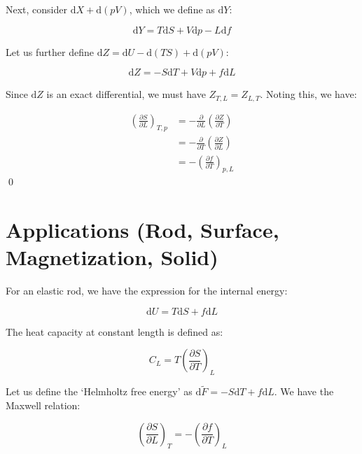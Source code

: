 \documentclass[12pt]{article}
\begin{document}
Next, consider $\mathrm{d}X + \mathrm{d}(pV)$, which we define as $\mathrm{d}Y$:

\begin{equation}
    \mathrm{d}Y = T\mathrm{d}S + V\mathrm{d}p - L\mathrm{d}f
\end{equation}

Let us further define $\mathrm{d}Z = \mathrm{d}U - \mathrm{d}(TS) + \mathrm{d}(pV)$:

\begin{equation}
    \mathrm{d}Z = -S\mathrm{d}T + V\mathrm{d}p + f\mathrm{d}L
\end{equation}

Since $\mathrm{d}Z$ is an exact differential, we must have $Z_{T, L} = Z_{L, T}$. Noting this, we have:

\begin{equation}
\begin{split}
    \left( \frac{\partial S}{\partial L} \right)_{T, p} &= - \frac{\partial }{\partial L} \left( \frac{\partial Z}{\partial T} \right) \\
    &= - \frac{\partial }{\partial T} \left( \frac{\partial Z}{\partial L} \right) \\
    &= - \left( \frac{\partial f}{\partial T} \right)_{p, L}
\end{split}
\end{equation}
\qed


\pagebreak
\section*{Applications (Rod, Surface, Magnetization, Solid)}


For an elastic rod, we have the expression for the internal energy:

\begin{equation}
    \mathrm{d}U = T\mathrm{d}S + f\mathrm{d}L
\end{equation}

The heat capacity at constant length is defined as:

\begin{equation}
    C_{L} = T \left( \frac{\partial S}{\partial T} \right)_{L}
\end{equation}

Let us define the `Helmholtz free energy' as $\mathrm{d}\tilde{F} = -S\mathrm{d}T + f\mathrm{d}L$. We have the Maxwell relation:

\begin{equation}
    \left( \frac{\partial S}{\partial L} \right)_{T} = -\left( \frac{\partial f}{\partial T} \right)_{L}
\end{equation}
\end{document}

